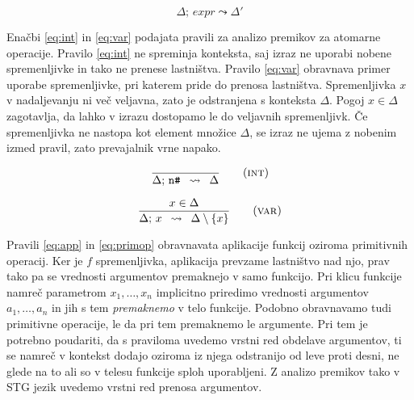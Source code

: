 \begin{equation}
    \Delta; \, expr \leadsto \Delta'
    \label{eq:analiza-premikov-oblika-pravil}
\end{equation}

Enačbi \ref{eq:int} in \ref{eq:var} podajata pravili za analizo premikov za atomarne operacije. Pravilo \ref{eq:int} ne spreminja konteksta, saj izraz ne uporabi nobene spremenljivke in tako ne prenese lastništva. Pravilo \ref{eq:var} obravnava primer uporabe spremenljivke, pri katerem pride do prenosa lastništva. Spremenljivka $x$ v nadaljevanju ni več veljavna, zato je odstranjena s konteksta $\Delta$. Pogoj $x \in \Delta$ zagotavlja, da lahko v izrazu dostopamo le do veljavnih spremenljivk. Če spremenljivka ne nastopa kot element množice $\Delta$, se izraz ne ujema z nobenim izmed pravil, zato prevajalnik vrne napako.


\begin{equation}
\infers[int]{}{
    \Delta; \, \texttt{n\#}
}{
    \Delta
}
\label{eq:int}
\end{equation}

\begin{equation}
\infers[var]{
    x \in \Delta
}{
    \Delta; \, x
}{
	\Delta \setminus \{ x \}
}
\label{eq:var}
\end{equation}

Pravili \ref{eq:app} in \ref{eq:primop} obravnavata aplikacije funkcij oziroma primitivnih operacij. Ker je $f$ spremenljivka, aplikacija prevzame lastništvo nad njo, prav tako pa se vrednosti argumentov premaknejo v samo funkcijo. Pri klicu funkcije namreč parametrom $x_1, \dots, x_n$ implicitno priredimo vrednosti argumentov $a_1, \dots, a_n$ in jih s tem \emph{premaknemo} v telo funkcije. Podobno obravnavamo tudi primitivne operacije, le da pri tem premaknemo le argumente. Pri tem je potrebno poudariti, da s praviloma uvedemo vrstni red obdelave argumentov, ti se namreč v kontekst dodajo oziroma iz njega odstranijo od leve proti desni, ne glede na to ali so v telesu funkcije sploh uporabljeni. Z analizo premikov tako v STG jezik uvedemo vrstni red prenosa argumentov.


